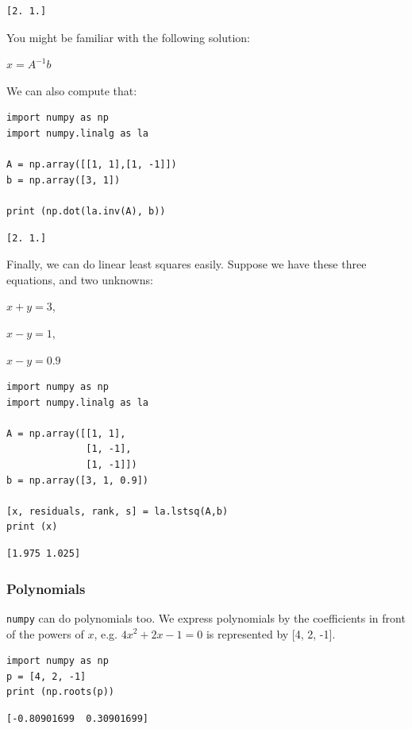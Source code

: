 \documentclass[11pt]{article}
\begin{document}
\begin{verbatim}
[2. 1.]
\end{verbatim}

You might be familiar with the following solution:

\(x = A^{-1} b\)

We can also compute that:

\begin{verbatim}
import numpy as np
import numpy.linalg as la

A = np.array([[1, 1],[1, -1]])
b = np.array([3, 1])

print (np.dot(la.inv(A), b))
\end{verbatim}

\begin{verbatim}
[2. 1.]
\end{verbatim}

Finally, we can do linear least squares easily. Suppose we have these three equations, and two unknowns:

\(x + y = 3\),

\(x - y = 1\),

\(x - y = 0.9\)

\begin{verbatim}
import numpy as np
import numpy.linalg as la

A = np.array([[1, 1],
              [1, -1],
              [1, -1]])
b = np.array([3, 1, 0.9])

[x, residuals, rank, s] = la.lstsq(A,b)
print (x)
\end{verbatim}

\begin{verbatim}
[1.975 1.025]
\end{verbatim}


\subsubsection{Polynomials}
\label{sec:orgb553b66}
\texttt{numpy} can do polynomials too. We express polynomials by the coefficients in front of the powers of \(x\), e.g. \(4 x^2 + 2x - 1 = 0\) is represented by [4, 2, -1].

\begin{verbatim}
import numpy as np
p = [4, 2, -1]
print (np.roots(p))
\end{verbatim}

\begin{verbatim}
[-0.80901699  0.30901699]
\end{verbatim}
\end{document}
